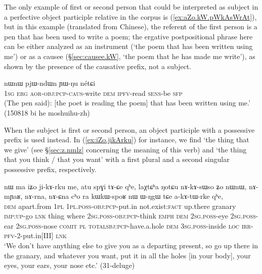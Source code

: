 The only example of first or second person that could be interpreted as subject in a perfective object participle relative in the corpus is (\ref{ex:aZo.kW.pWkAsWrAt}), but in this example (translated from Chinese), the referent of the first person is a pen that has been used to write a poem; the ergative postpositional phrase  here can be either analyzed as an instrument (`the poem that has been written using me') or as a causee  (§\ref{sec:causee.kW}, `the poem that he has made me write'), as shown by the presence of the causative  prefix, not a subject.

\begin{exe}
\ex \label{ex:aZo.kW.pWkAsWrAt}
 nɯnɯ pjɯ-ndɯn ɲɯ-ŋu nétɕi \\
\textsc{1sg} \textsc{erg} \textsc{aor}-\textsc{obj}:\textsc{pcp}-\textsc{caus}-write \textsc{dem} \textsc{ipfv}-read \textsc{sens}-be \textsc{sfp} \\
\glt (The pen said): [the poet is reading the poem] that has been written using me.' (150818 bi he moshuihu-zh)
\end{exe}  

When the subject is first or second person, an object participle with a possessive prefix  is used instead. In (\ref{ex:iZo.jikArku}) for instance, we find  `the thing that we give' (see §\ref{sec:z.nmlz} concerning the meaning of this verb) and  `the thing that you think / that you want' with a first plural and a second singular possessive prefix, respectively.

\begin{exe}
\ex \label{ex:iZo.jikArku}
\gll   nɯ ma iʑo ji-kɤ-rku me,  atu spɣi tɤ-ɕe qʰe, laχtɕʰa ŋotɕu nɤ-kɤ-sɯso ʑo nɯnɯ, 
nɤ-mɲaʁ, nɤ-rna, nɤ-ɕna cʰo ra kɯ\redp{}kɯ-spoʁ nɯ ɯ-ŋgɯ tɕe a-kɤ-tɯ-rke qʰe, \\
\textsc{dem} apart.from \textsc{1pl} \textsc{1pl}.\textsc{poss}-\textsc{obj}:\textsc{pcp}-put.in not.exist:\textsc{fact} up.there granary \textsc{imp}:\textsc{up}-go \textsc{lnk} thing where \textsc{2sg}.\textsc{poss}-\textsc{obj}:\textsc{pcp}-think \textsc{emph} \textsc{dem} \textsc{2sg}.\textsc{poss}-eye  \textsc{2sg}.\textsc{poss}-ear  \textsc{2sg}.\textsc{poss}-nose \textsc{comit} \textsc{pl}  \textsc{total}\redp{}\textsc{sbj}:\textsc{pcp}-have.a.hole \textsc{dem} \textsc{3sg}.\textsc{poss}-inside \textsc{loc} \textsc{irr}-\textsc{pfv}-2-put.in[III] \textsc{lnk} \\
\glt `We don't have anything else to give you as a departing present, so go up there in the granary, and whatever you want, put it in all the holes [in your body], your eyes, your ears, your nose etc.' (31-deluge) 	
\end{exe}  

